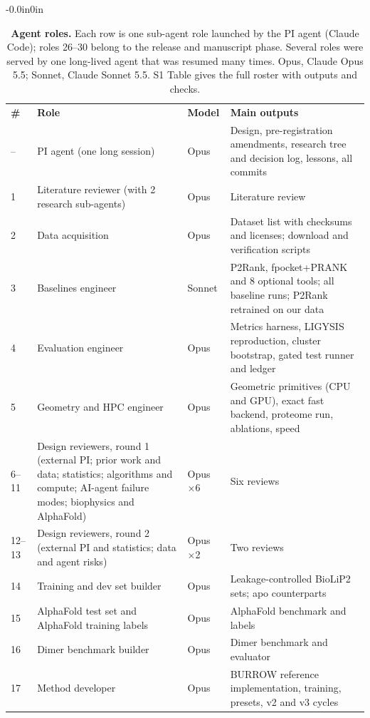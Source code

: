\documentclass[10pt,letterpaper]{article}
\newlength\savedwidth
\newcommand\thickhline{\noalign{\global\savedwidth\arrayrulewidth\global\arrayrulewidth 2pt}%
\hline
\noalign{\global\arrayrulewidth\savedwidth}}
\begin{document}
\begin{table}[!ht]
\begin{adjustwidth}{-0.0in}{0in}
\centering
\caption{{\bf Agent roles.} Each row is one sub-agent role launched by the PI agent (Claude Code); roles 26--30 belong to the release and manuscript phase. Several roles were served by one long-lived agent that was resumed many times. Opus, Claude Opus 5.5; Sonnet, Claude Sonnet 5.5. S1 Table gives the full roster with outputs and checks.}
\label{table_agents}
{\footnotesize
\begin{tabular}{p{0.6cm}p{5.6cm}p{1.6cm}p{6.3cm}}
\hline
\textbf{\#} & \textbf{Role} & \textbf{Model} & \textbf{Main outputs} \\ \thickhline
-- & PI agent (one long session) & Opus & Design, pre-registration amendments, research tree and decision log, lessons, all commits \\ \hline
1 & Literature reviewer (with 2 research sub-agents) & Opus & Literature review \\ \hline
2 & Data acquisition & Opus & Dataset list with checksums and licenses; download and verification scripts \\ \hline
3 & Baselines engineer & Sonnet & P2Rank, fpocket+PRANK and 8 optional tools; all baseline runs; P2Rank retrained on our data \\ \hline
4 & Evaluation engineer & Opus & Metrics harness, LIGYSIS reproduction, cluster bootstrap, gated test runner and ledger \\ \hline
5 & Geometry and HPC engineer & Opus & Geometric primitives (CPU and GPU), exact fast backend, proteome run, ablations, speed \\ \hline
6--11 & Design reviewers, round 1 (external PI; prior work and data; statistics; algorithms and compute; AI-agent failure modes; biophysics and AlphaFold) & Opus $\times$6 & Six reviews \\ \hline
12--13 & Design reviewers, round 2 (external PI and statistics; data and agent risks) & Opus $\times$2 & Two reviews \\ \hline
14 & Training and dev set builder & Opus & Leakage-controlled BioLiP2 sets; apo counterparts \\ \hline
15 & AlphaFold test set and AlphaFold training labels & Opus & AlphaFold benchmark and labels \\ \hline
16 & Dimer benchmark builder & Opus & Dimer benchmark and evaluator \\ \hline
17 & Method developer & Opus & BURROW reference implementation, training, presets, v2 and v3 cycles \\ \hline

\end{tabular}}
\end{adjustwidth}
\end{table}
\end{document}

